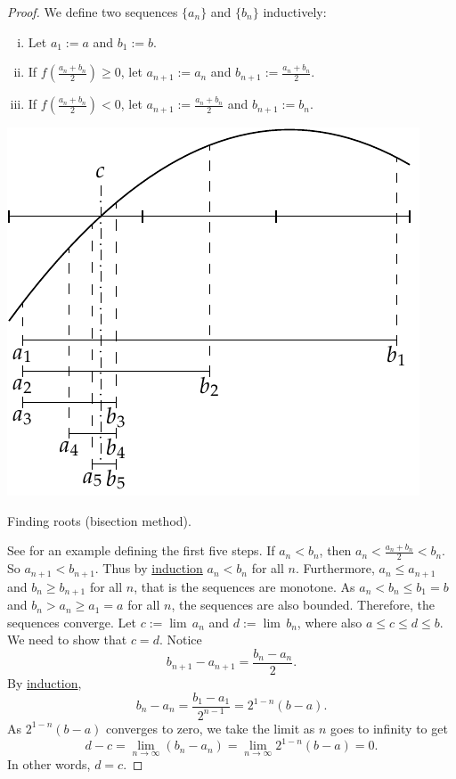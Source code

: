 \begin{proof}
We define two sequences $\{ a_n \}$
and $\{ b_n \}$ inductively:
\begin{enumerate}[(i)]
\item Let $a_1 := a$ and $b_1 := b$.
\item If $f\left(\frac{a_n+b_n}{2}\right) \geq 0$, let $a_{n+1} := a_n$ and
$b_{n+1} := \frac{a_n+b_n}{2}$.
\item If $f\left(\frac{a_n+b_n}{2}\right) < 0$, let $a_{n+1} := \frac{a_n+b_n}{2}$ and
$b_{n+1} := b_n$.
\end{enumerate}
\begin{myfigureht}
\includegraphics{figures/bisect}
\caption{Finding roots (bisection method).\label{bisectfig}}
\end{myfigureht}
See  for an example defining the first five steps.
If $a_n < b_n$, then $a_n < \frac{a_n+b_n}{2} < b_n$.  So
$a_{n+1} < b_{n+1}$.
Thus by \hyperref[induction:thm]{induction} $a_n < b_n$ for all $n$.
Furthermore, $a_n \leq a_{n+1}$ and 
$b_n \geq b_{n+1}$ for all $n$, that is the sequences are monotone.
As $a_n < b_n \leq b_1 = b$ and 
$b_n > a_n \geq a_1 = a$ for all $n$,
the sequences are also bounded.  Therefore, the
sequences converge.  Let $c := \lim\, a_n$ and $d := \lim\, b_n$,
where also $a \leq c \leq d \leq b$.  We need
to show that $c=d$.
Notice
\begin{equation*}
b_{n+1} - a_{n+1} = \frac{b_n-a_n}{2}.
\end{equation*}
By \hyperref[induction:thm]{induction},
\begin{equation*}
b_n - a_n = \frac{b_1-a_1}{2^{n-1}} = 2^{1-n} (b-a) .
\end{equation*}
As $2^{1-n}(b-a)$ converges to zero, we take the limit as $n$ goes to
infinity to get
\begin{equation*}
d-c = \lim_{n\to\infty} (b_n - a_n) =
\lim_{n\to\infty} 2^{1-n} (b-a) = 0.
\end{equation*}
In other words, $d=c$.


\end{proof}
